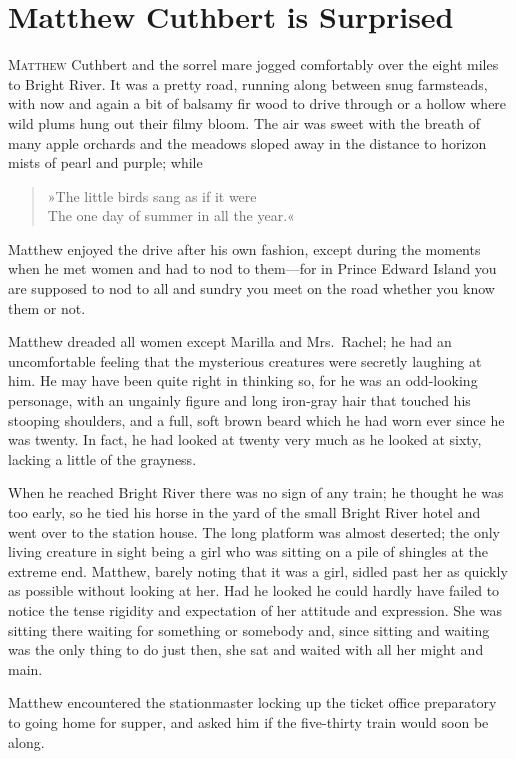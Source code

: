 \chapter{Matthew Cuthbert is Surprised}

\lettrine[lines=4]{M}{atthew} Cuthbert and the sorrel mare jogged comfortably over the eight miles to Bright River. It was a pretty road, running along between snug farmsteads, with now and again a bit of balsamy fir wood to drive through or a hollow where wild plums hung out their filmy bloom. The air was sweet with the breath of many apple orchards and the meadows sloped away in the distance to horizon mists of pearl and purple; while

\begin{verse}
»The little birds sang as if it were\\
The one day of summer in all the year.«
\end{verse}

Matthew enjoyed the drive after his own fashion, except during the moments when he met women and had to nod to them—for in Prince Edward Island you are supposed to nod to all and sundry you meet on the road whether you know them or not.

Matthew dreaded all women except Marilla and Mrs.~Rachel; he had an uncomfortable feeling that the mysterious creatures were secretly laughing at him. He may have been quite right in thinking so, for he was an odd-looking personage, with an ungainly figure and long iron-gray hair that touched his stooping shoulders, and a full, soft brown beard which he had worn ever since he was twenty. In fact, he had looked at twenty very much as he looked at sixty, lacking a little of the grayness.

When he reached Bright River there was no sign of any train; he thought he was too early, so he tied his horse in the yard of the small Bright River hotel and went over to the station house. The long platform was almost deserted; the only living creature in sight being a girl who was sitting on a pile of shingles at the extreme end. Matthew, barely noting that it was a girl, sidled past her as quickly as possible without looking at her. Had he looked he could hardly have failed to notice the tense rigidity and expectation of her attitude and expression. She was sitting there waiting for something or somebody and, since sitting and waiting was the only thing to do just then, she sat and waited with all her might and main.

Matthew encountered the stationmaster locking up the ticket office preparatory to going home for supper, and asked him if the five-thirty train would soon be along.

